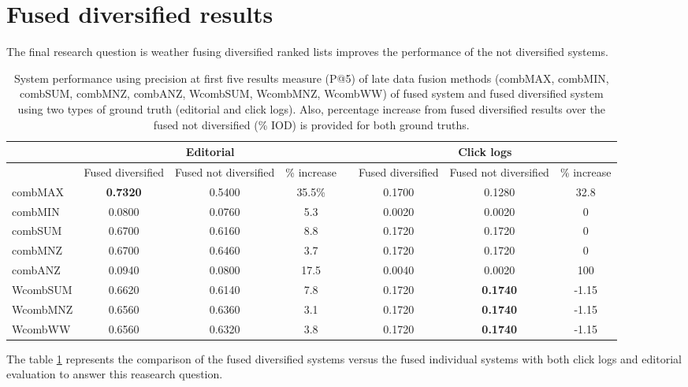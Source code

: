 \section{Fused diversified results}

The final research question is weather fusing diversified ranked lists improves the performance of the not diversified systems.

\begin{table}[H]
\begin{center}
\scriptsize
\caption{System performance using precision at first five results measure (P@5) of late data fusion methods (combMAX, combMIN, combSUM, combMNZ, combANZ, WcombSUM, WcombMNZ, WcombWW) of fused system and fused diversified system using two types of ground truth (editorial and click logs). Also, percentage increase from fused diversified results over the fused not diversified (\% IOD) is provided for both ground truths.}
\label{table:ldfMmrP5}

\begin{tabular}{lccccccc}
\toprule
 & \multicolumn{3}{c}{Editorial} & & \multicolumn{3}{c}{Click logs} \\
\midrule
 & Fused diversified & Fused not diversified & \% increase &   & Fused diversified & Fused not diversified & \% increase\\
 \midrule
	combMAX & \textbf{0.7320} & 0.5400 & 35.5\% &   & 0.1700 & 0.1280 & 32.8\\
	combMIN & 0.0800 & 0.0760 & 5.3 &   & 0.0020 & 0.0020 & 0\\
	combSUM & 0.6700 & 0.6160 & 8.8 &   & 0.1720 & 0.1720 & 0 \\
	combMNZ & 0.6700 & 0.6460 & 3.7 &   & 0.1720 & 0.1720 & 0\\
	combANZ & 0.0940 & 0.0800 & 17.5 &   & 0.0040 & 0.0020 & 100\\
	WcombSUM & 0.6620 & 0.6140 & 7.8 &   & 0.1720 & \textbf{0.1740} & -1.15\\
	WcombMNZ & 0.6560 & 0.6360 & 3.1 &   & 0.1720 & \textbf{0.1740} & -1.15\\
	WcombWW & 0.6560 & 0.6320 & 3.8 &   & 0.1720 & \textbf{0.1740} & -1.15\\
\bottomrule
\end{tabular}
\end{center}
\end{table}

The table \ref{table:ldfMmrP5} represents the comparison of the fused diversified systems versus the fused individual systems with both click logs and editorial evaluation to answer this reasearch question.

